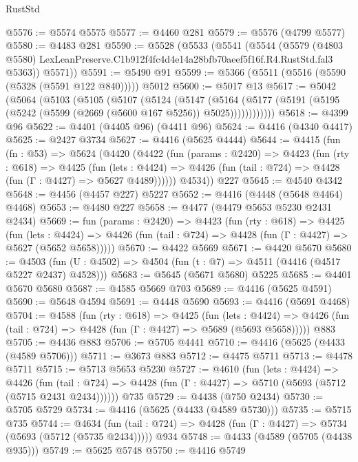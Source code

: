 \begin{lexlean}{RustStd}
\begin{coremodule}
@5576 := @5574 @5575
@5577 := @4460 @281
@5579 := @5576 (@4799 @5577)
@5580 := @4483 @281
@5590 := @5528
    (@5533
      (@5541
        (@5544
          (@5579
            (@4803 @5580)
            LexLeanPreserve.C1b912f4fc4d4e14a28bfb70aeef5f16f.R4.RustStd.fal3
            @5363))
        @5571))
@5591 := @5490 @91
@5599 := @5366 (@5511 (@5516 (@5590 (@5328 (@5591 @122 @840))))) @5012
@5600 := @5017 @13
@5617 := @5042
    (@5064
      (@5103
        (@5105
          (@5107
            (@5124
              (@5147
                (@5164
                  (@5177 (@5191 (@5195 (@5242 (@5599 (@2669 (@5600 @167 @5256)) @5025))))))))))))
@5618 := @4399 @96
@5622 := @4401 (@4405 @96) (@4411 @96)
@5624 := @4416 (@4340 @4417)
@5625 := @2427 @3734
@5627 := @4416 (@5625 @4444)
@5644 := @4415
    (fun (fn : @53) =>
    @5624
      (@4420
        (@4422
          (fun (params : @2420) =>
          @4423
            (fun (rty : @618) =>
            @4425
              (fun (lets : @4424) =>
              @4426 (fun (tail : @724) => @4428 (fun (Γ : @4427) => @5627 @4489))))))
        @4534))
    @227
@5645 := @4540 @4342
@5648 := @4456 (@4457 @227) @5227
@5652 := @4416 (@4448 (@5648 @4464) @4468)
@5653 := @4480 @227
@5658 := @4477 (@4479 @5653 @5230 @2431 @2434)
@5669 := fun (params : @2420) =>
  @4423
    (fun (rty : @618) =>
    @4425
      (fun (lets : @4424) =>
      @4426 (fun (tail : @724) => @4428 (fun (Γ : @4427) => @5627 (@5652 @5658)))))
@5670 := @4422 @5669
@5671 := @4420 @5670
@5680 := @4503 (fun (U : @4502) => @4504 (fun (t : @7) => @4511 (@4416 (@4517 @5227 @2437) @4528)))
@5683 := @5645 (@5671 @5680) @5225
@5685 := @4401 @5670 @5680
@5687 := @4585 @5669 @703
@5689 := @4416 (@5625 @4591)
@5690 := @5648 @4594
@5691 := @4448 @5690
@5693 := @4416 (@5691 @4468)
@5704 := @4588
    (fun (rty : @618) =>
    @4425
      (fun (lets : @4424) =>
      @4426 (fun (tail : @724) => @4428 (fun (Γ : @4427) => @5689 (@5693 @5658)))))
    @883
@5705 := @4436 @883
@5706 := @5705 @4441
@5710 := @4416 (@5625 (@4433 (@4589 @5706)))
@5711 := @3673 @883
@5712 := @4475 @5711
@5713 := @4478 @5711
@5715 := @5713 @5653 @5230
@5727 := @4610
    (fun (lets : @4424) =>
    @4426
      (fun (tail : @724) => @4428 (fun (Γ : @4427) => @5710 (@5693 (@5712 (@5715 @2431 @2434))))))
    @735
@5729 := @4438 (@750 @2434)
@5730 := @5705 @5729
@5734 := @4416 (@5625 (@4433 (@4589 @5730)))
@5735 := @5715 @735
@5744 := @4634
    (fun (tail : @724) => @4428 (fun (Γ : @4427) => @5734 (@5693 (@5712 (@5735 @2434)))))
    @934
@5748 := @4433 (@4589 (@5705 (@4438 @935)))
@5749 := @5625 @5748
@5750 := @4416 @5749

\end{coremodule}
\end{lexlean}

